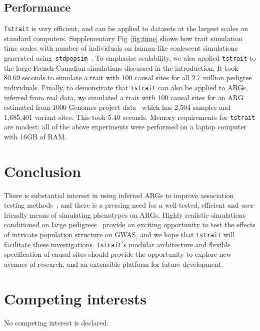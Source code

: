 \documentclass[unnumsec,webpdf,modern,large,namedate]{oup-authoring-template}%
\begin{document}
\subsection{Performance}
\texttt{Tstrait} is very efficient, and can be applied to datasets at the
largest scales on standard computers.
Supplementary Fig~\ref{fig:time} shows how trait simulation time scales
with number of individuals on human-like coalescent simulations
generated using~\texttt{stdpopsim}~\citep{adrion2020}.
To emphasise scalability, we also
applied \texttt{tstrait} to the large
French-Canadian simulations discussed in the introduction.
It took 80.69 seconds to simulate a trait with 100 causal sites
for all 2.7 million pedigree individuals.
Finally, to demonstrate that \texttt{tstrait} can also be applied
to ARGs inferred from real data, we simulated a trait with 100 causal
sites for an ARG estimated from 1000 Genomes project
data~\citep{kelleher2019} which has 2,504 samples
and 1,685,401 variant sites. This took 5.40 seconds.
Memory requirements for \texttt{tstrait} are modest: all of the
above experiments were performed on a laptop computer with 16GB of RAM.

\section{Conclusion}
There is substantial interest in using inferred ARGs to improve
association testing
methods~\citep{zhang2023,link2023tree,nowbandegani2023extremely},
and there is a pressing need for a well-tested, efficient
and user-friendly means of simulating phenotypes on ARGs.
Highly realistic simulations conditioned on large
pedigrees~\citep{anderson2023} provide an exciting opportunity
to test the effects of intricate population structure on
GWAS, and we hope that \texttt{tstrait} will facilitate these
investigations. \texttt{Tstrait}'s modular architecture
and flexible specification of causal sites
should provide the opportunity to explore new avenues of research,
and an extensible platform for future development.

\section{Competing interests}
No competing interest is declared.
\end{document}
